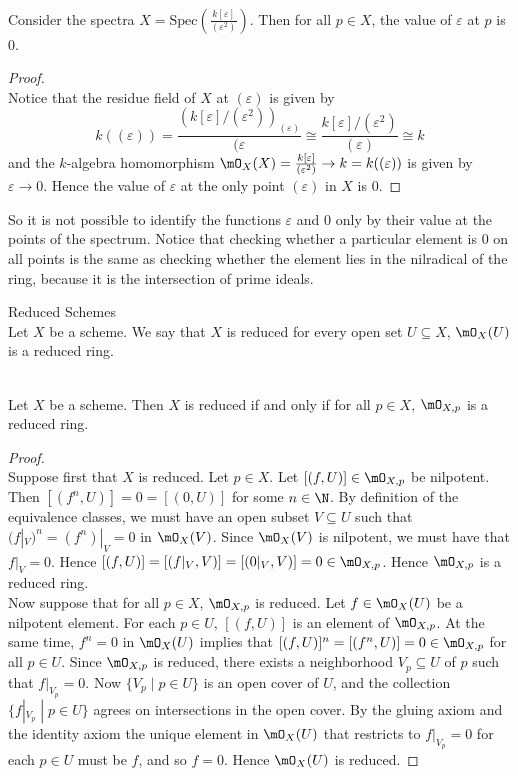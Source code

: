 \documentclass[a4paper]{article}
\begin{document}
\begin{eg}{}{}\\
Consider the spectra $X=\text{Spec}\left(\frac{k[\varepsilon]}{(\varepsilon^2)}\right)$. Then for all $p\in X$, the value of $\varepsilon$ at $p$ is $0$. 
\begin{proof}\\
Notice that the residue field of $X$ at $(\varepsilon)$ is given by $$k((\varepsilon))=\frac{(k[\varepsilon]/(\varepsilon^2))_{(\varepsilon)}}{(\varepsilon}\cong\frac{k[\varepsilon]/(\varepsilon^2)}{(\varepsilon)}\cong k$$ and the $k$-algebra homomorphism $\mO_X(X)=\frac{k[\varepsilon]}{(\varepsilon^2)}\to k=k((\varepsilon))$ is given by $\varepsilon\to 0$. Hence the value of $\varepsilon$ at the only point $(\varepsilon)$ in $X$ is $0$. 
\end{proof}
\end{eg}

So it is not possible to identify the functions $\varepsilon$ and $0$ only by their value at the points of the spectrum. Notice that checking whether a particular element is $0$ on all points is the same as checking whether the element lies in the nilradical of the ring, because it is the intersection of prime ideals. 

\begin{defn}{Reduced Schemes}{}\\
Let $X$ be a scheme. We say that $X$ is reduced for every open set $U\subseteq X$, $\mO_X(U)$ is a reduced ring. 
\end{defn}

\begin{lmm}{}{}\\
Let $X$ be a scheme. Then $X$ is reduced if and only if for all $p\in X$, $\mO_{X,p}$ is a reduced ring. 
\begin{proof}\\
Suppose first that $X$ is reduced. Let $p\in X$. Let $[(f,U)]\in\mO_{X,p}$ be nilpotent. Then $[(f^n,U)]=0=[(0,U)]$ for some $n\in\N$. By definition of the equivalence classes, we must have an open subset $V\subseteq U$ such that $(f|_V)^n=(f^n)|_V=0$ in $\mO_X(V)$. Since $\mO_X(V)$ is nilpotent, we must have that $f|_V=0$. Hence $[(f,U)]=[(f|_V,V)]=[(0|_V,V)]=0\in\mO_{X,p}$. Hence $\mO_{X,p}$ is a reduced ring. \\

Now suppose that for all $p\in X$, $\mO_{X,p}$ is reduced. Let $f\in\mO_X(U)$ be a nilpotent element. For each $p\in U$, $[(f,U)]$ is an element of $\mO_{X,p}$. At the same time, $f^n=0$ in $\mO_X(U)$ implies that $[(f,U)]^n=[(f^n,U)]=0\in\mO_{X,p}$ for all $p\in U$. Since $\mO_{X,p}$ is reduced, there exists a neighborhood $V_p\subseteq U$ of $p$ such that $f|_{V_p}=0$. Now $\{V_p\;|\;p\in U\}$ is an open cover of $U$, and the collection $\{f|_{V_p}\;|\;p\in U\}$ agrees on intersections in the open cover. By the gluing axiom and the identity axiom the unique element in $\mO_X(U)$ that restricts to $f|_{V_p}=0$ for each $p\in U$ must be $f$, and so $f=0$. Hence $\mO_X(U)$ is reduced. 
\end{proof}
\end{lmm}
\end{document}
